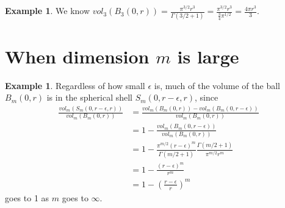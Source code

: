 \documentclass[11pt]{amsart}
\theoremstyle{definition}
\newtheorem{example}[theorem]{Example}
\begin{document}
\begin{example} We know $vol_3(B_3(0, r)) = \frac{\pi^{3/2} r^3}{\Gamma(3/2 + 1)} = \frac{\pi^{3/2} r^3}{\frac{3}{4} \pi^{1/2}}= \frac{4 \pi r^3}{3}$.
\end{example}

\section{When dimension $m$ is large}

\begin{example} \label{volume} Regardless of how small $\epsilon$ is, much of the volume of the ball $B_m(0, r)$ is in the spherical shell $S_m(0, r - \epsilon, r)$, since
\begin{align*}
\frac{vol_m(S_m(0, r - \epsilon, r))}{vol_m(B_m(0, r))} & = \frac{vol_m(B_m(0, r)) - vol_m(B_m(0, r - \epsilon))}{vol_m(B_m(0, r))} \\
 & = 1 - \frac{vol_m(B_m(0, r - \epsilon))}{vol_m(B_m(0, r))} \\
 & = 1 - \frac{\pi^{m/2} (r - \epsilon)^m}{\Gamma(m/2 + 1)} \frac{\Gamma(m/2 + 1)}{\pi^{m/2} r^m} \\
 & = 1 - \frac{(r - \epsilon)^m}{r^m} \\
 & = 1 - \left( \frac{r - \epsilon}{r} \right)^m
\end{align*}
goes to 1 as $m$ goes to $\infty$.
\end{example}
\end{document}
